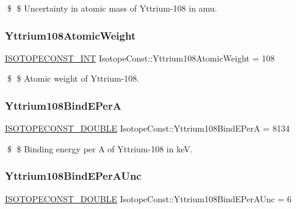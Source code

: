 \$ \$ Uncertainty in atomic mass of Yttrium-\/108 in amu. \mbox{\label{group___isotope_const-_yttrium-_y108_ga2ca0300f2e3a6ac215b37dd4fb488659}} 
\subsubsection{\texorpdfstring{Yttrium108\+Atomic\+Weight}{Yttrium108AtomicWeight}}
{\footnotesize\ttfamily \mbox{\hyperlink{group___isotope_const-_macros_ga5f18360b3e99483a35c32d789e62621c}{I\+S\+O\+T\+O\+P\+E\+C\+O\+N\+S\+T\+\_\+\+I\+NT}} Isotope\+Const\+::\+Yttrium108\+Atomic\+Weight = 108}

\$ \$ Atomic weight of Yttrium-\/108. \mbox{\label{group___isotope_const-_yttrium-_y108_gad1b4364edbca1605b86c70d13cc0845a}} 
\subsubsection{\texorpdfstring{Yttrium108\+Bind\+E\+PerA}{Yttrium108BindEPerA}}
{\footnotesize\ttfamily \mbox{\hyperlink{group___isotope_const-_macros_ga8f45a7272ce02c0b4c65c44636ed719a}{I\+S\+O\+T\+O\+P\+E\+C\+O\+N\+S\+T\+\_\+\+D\+O\+U\+B\+LE}} Isotope\+Const\+::\+Yttrium108\+Bind\+E\+PerA = 8134}

\$ \$ Binding energy per A of Yttrium-\/108 in keV. \mbox{\label{group___isotope_const-_yttrium-_y108_ga86c4255c89a3f047df03548dfeca893c}} 
\subsubsection{\texorpdfstring{Yttrium108\+Bind\+E\+Per\+A\+Unc}{Yttrium108BindEPerAUnc}}
{\footnotesize\ttfamily \mbox{\hyperlink{group___isotope_const-_macros_ga8f45a7272ce02c0b4c65c44636ed719a}{I\+S\+O\+T\+O\+P\+E\+C\+O\+N\+S\+T\+\_\+\+D\+O\+U\+B\+LE}} Isotope\+Const\+::\+Yttrium108\+Bind\+E\+Per\+A\+Unc = 6}

